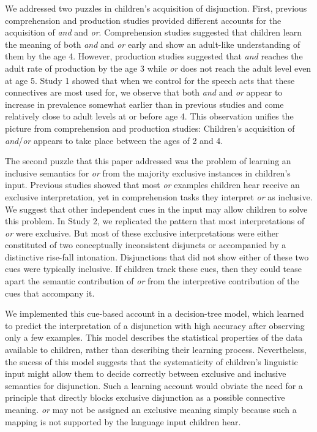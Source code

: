 \documentclass[10pt, letterpaper]{article}
\begin{document}
We addressed two puzzles in children's acquisition of disjunction.
First, previous comprehension and production studies provided different
accounts for the acquisition of \emph{and} and \emph{or}. Comprehension
studies suggested that children learn the meaning of both \emph{and} and
\emph{or} early and show an adult-like understanding of them by the age
4. However, production studies suggested that \emph{and} reaches the
adult rate of production by the age 3 while \emph{or} does not reach the
adult level even at age 5. Study 1 showed that when we control for the
speech acts that these connectives are most used for, we observe that
both \emph{and} and \emph{or} appear to increase in prevalence somewhat
earlier than in previous studies and come relatively close to adult
levels at or before age 4. This observation unifies the picture from
comprehension and production studies: Children's acquisition of
\emph{and}/\emph{or} appears to take place between the ages of 2 and 4.

The second puzzle that this paper addressed was the problem of learning
an inclusive semantics for \emph{or} from the majority exclusive
instances in children's input. Previous studies showed that most
\emph{or} examples children hear receive an exclusive interpretation,
yet in comprehension tasks they interpret \emph{or} as inclusive. We
suggest that other independent cues in the input may allow children to
solve this problem. In Study 2, we replicated the pattern that most
interpretations of \emph{or} were exclusive. But most of these exclusive
interpretations were either constituted of two conceptually inconsistent
disjuncts or accompanied by a distinctive rise-fall intonation.
Disjunctions that did not show either of these two cues were typically
inclusive. If children track these cues, then they could tease apart the
semantic contribution of \emph{or} from the interpretive contribution of
the cues that accompany it.

We implemented this cue-based account in a decision-tree model, which
learned to predict the interpretation of a disjunction with high
accuracy after observing only a few examples. This model describes the
statistical properties of the data available to children, rather than
describing their learning process. Nevertheless, the sucess of this
model suggests that the systematicity of children's linguistic input
might allow them to decide correctly between exclusive and inclusive
semantics for disjunction. Such a learning account would obviate the
need for a principle that directly blocks exclusive disjunction as a
possible connective meaning. \emph{or} may not be assigned an exclusive
meaning simply because such a mapping is not supported by the language
input children hear.
\end{document}
